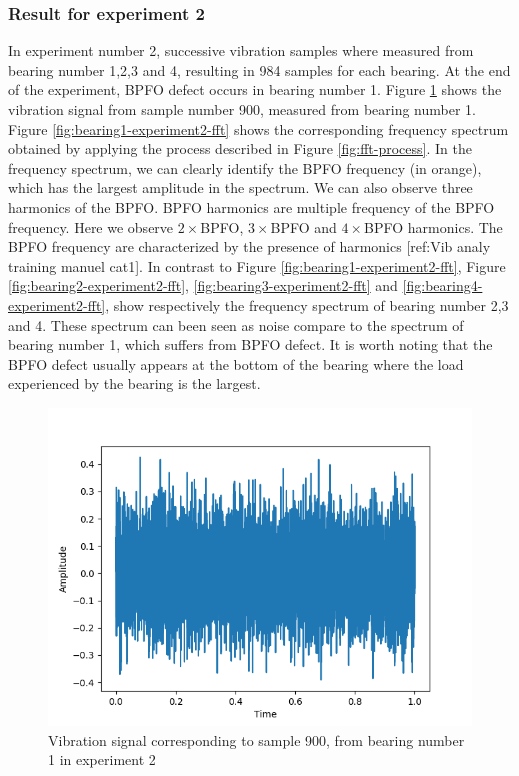 \documentclass[../Main/thesis.tex]{subfiles}
\begin{document}
\subsubsection{Result for experiment 2}
In experiment number 2, successive vibration samples where measured from bearing number 1,2,3 and 4, resulting in 984 samples for each bearing.  At the end of the experiment, BPFO defect occurs in bearing number 1. Figure \ref{fig:bearing1-experiment2} shows the vibration signal from sample number 900, measured from bearing number 1. Figure \ref{fig:bearing1-experiment2-fft} shows the corresponding frequency spectrum obtained by applying the process described in Figure \ref{fig:fft-process}.
\justify
In the frequency spectrum, we can clearly identify the BPFO frequency (in orange), which has the largest amplitude in the spectrum. We can also observe three harmonics of the BPFO.
BPFO harmonics are multiple frequency of the BPFO frequency. Here we observe $2\times$BPFO, $3\times$BPFO and $4\times$BPFO harmonics. The BPFO frequency are characterized by the presence of harmonics [ref:Vib analy training manuel cat1]. 
\justify
In contrast to Figure \ref{fig:bearing1-experiment2-fft}, Figure \ref{fig:bearing2-experiment2-fft}, \ref{fig:bearing3-experiment2-fft} and \ref{fig:bearing4-experiment2-fft}, show respectively the frequency spectrum of bearing number 2,3 and 4. These spectrum can been seen as noise compare to the spectrum of bearing number 1, which suffers from BPFO defect. It is worth noting that the BPFO defect usually appears at the bottom of the bearing where the load experienced by the bearing is the largest.
\begin{figure}[H] %
   \centering
   \includegraphics[width=6in]{../fig/experiment2_bearing1.png} 
   \caption{Vibration signal corresponding to sample 900, from bearing number 1 in  experiment 2}
   \label{fig:bearing1-experiment2}
\end{figure}
\end{document}
